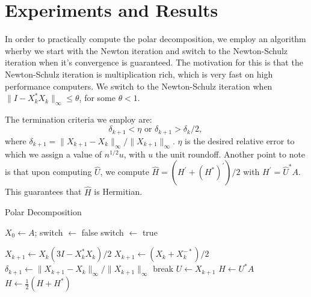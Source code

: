 \documentclass[12pt]{article}
\def\normo#1{\|#1\|_{\infty}}
\begin{document}
\section{Experiments and Results}
In order to practically compute the polar decomposition, we employ an algorithm
wherby we start with the Newton iteration and switch to the Newton-Schulz
iteration when it's convergence is guaranteed. The motivation for this is that
the Newton-Schulz iteration is multiplication rich, which is very fast on high
performance computers. We switch to the Newton-Schulz iteration when
$\normo{I - X_k^*X_k} \leq \theta$, for some $\theta < 1$.

The termination criteria we employ are:
\begin{equation*}
  \delta_{k+1} < \eta \text{ or } \delta_{k+1} > \delta_k /2\text{, }
\end{equation*}
where $\delta_{k+1} = \normo{X_{k+1} - X_k}/\normo{X_{k+1}}$. $\eta$ is the
desired relative error to which we assign a value of $n^{1/2}u$, with $u$ the
unit roundoff. Another point to note is that upon computing $\hat{U}$, we
compute $\hat{H} = (H^{\prime} + (H^*)^{\prime})/2$ with
$H^{\prime} = \hat{U}^*A$. This guarantees that $\hat{H}$ is Hermitian.

\begin{algorithm}
  \caption{Polar Decomposition}\label{polar_decomp}
  \begin{algorithmic}[1]
    \State $X_0 \gets A$; switch $\gets$ false
    \If{$\normo{I-X_k^*X_k} \leq \theta$}
    \State switch $\gets$ true
    \EndIf
    \EndIf

    \State $X_{k+1} \gets X_k(3I - X_k^*X_k)/2$
    \Else
    \State $X_{k+1} \gets (X_k + X_k^{-*})/2$
    \EndIf
    \State $\delta_{k+1} \gets \normo{X_{k+1} - X_k}/\normo{X_{k+1}}$
    \State break
    \EndIf
    \EndFor
    \State $U \gets X_{k+1}$
    \State $H \gets U^*A$
    \State $H \gets \frac{1}{2}(H + H^*)$
  \end{algorithmic}
\end{algorithm}
\end{document}
